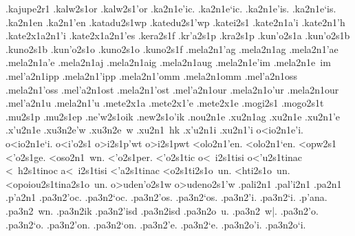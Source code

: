 {.kajupe2r1 		%
.kalw2s1or 	 	%
.kalw2s1'or
.ka2n1e'ic.		%
.ka2n1e`ic.
.ka2n1e'is.
.ka2n1e`is.
.ka2n1en
.ka2n1'en		
.katadu2s1wp 		%
.katedu2s1'wp  		%
.katei2s1 		%
.kate2n1a'i 		%
.kate2n1'h 		%
.kate2x1a2n1'i 		%
.kate2x1a2n1'es   	%
.kera2s1f 		%
.kr'a2s1p 		%
.kra2s1p
.kun'o2s1a 		%
.kun'o2s1b 		%
.kuno2s1b
.kun'o2s1o 		%
.kuno2s1o
.kuno2s1f  		%
.mela2n1'ag			%
.mela2n1ag
.mela2n1'ae			%
.mela2n1a'e
.mela2n1aj			%
.mela2n1aig 		%
.mela2n1aug 		%
.mela2n1e'im 		%
.mela2n1e~im 		%
.mel'a2n1ipp 		%
.mela2n1'ipp
.mela2n1'omm 		%
.mela2n1omm
.mel'a2n1oss 		%
.mela2n1'oss
.mel'a2n1ost 		%
.mela2n1'ost
.mel'a2n1our 		%
.mela2n1o'ur
.mela2n1our  		%
.mel'a2n1u		%
.mela2n1'u
.mete2x1a   		%
.mete2x1'e  		%
.mete2x1e
.mogi2s1    		%
.mogo2s1t    		%
.mu2s1p      		%
.mu2s1ep   		%
.ne'w2s1oik  		%
.new2s1o'ik
.nou2n1e     		%
.xu2n1ag		%
.xu2n1e
.xu2n1'e
.x'u2n1e
	.xu3n2e'w 		%
	.xu3n2e~w
.xu2n1~hk 		%
.x'u2n1i  		%
.xu2n1'i  		%
o<io2n1e'i.		%
o<io2n1e`i.
o<i'o2s1		%
o>i2s1p'wt 		%
o>i2s1pwt
<olo2n1'en.
<olo2n1`en.
<opw2s1			%
<'o2s1ge.               %
<oso2n1~wn.  		%
<'o2s1per.		%
<'o2s1tic 		%
 o<~i2s1tisi		%
 o<'u2s1tinac		%
 <~h2s1tinoc 		%
 a<~i2s1tisi   		%
 <'a2s1tinac 		%
 <o2s1ti2s1o~un.	%
 <hti2s1o~un.  		%
 <opoiou2s1tina2s1o~un.	%
o>uden'o2s1w 		%
o>udeno2s1'w 		
.pali2n1 		%
.pal'i2n1 		%
.pa2n1
.p'a2n1
	.pa3n2'oc. 		%
	.pa3n2`oc.
	.pa3n2'os.
	.pa3n2`os.
	.pa3n2'i.
	.pa3n2`i.
	.p'ana.
	.pa3n2~wn.
	.pa3n2ik  		%
	.pa3n2'isd 		%
	.pa3n2isd  		%
	.pa3n2o~u. 		%
	.pa3n2~w|.
	.pa3n2'o.
	.pa3n2`o.
	.pa3n2'on.
	.pa3n2`on.
	.pa3n2'e.
	.pa3n2`e.
	.pa3n2o'i.
	.pa3n2o`i.
}
